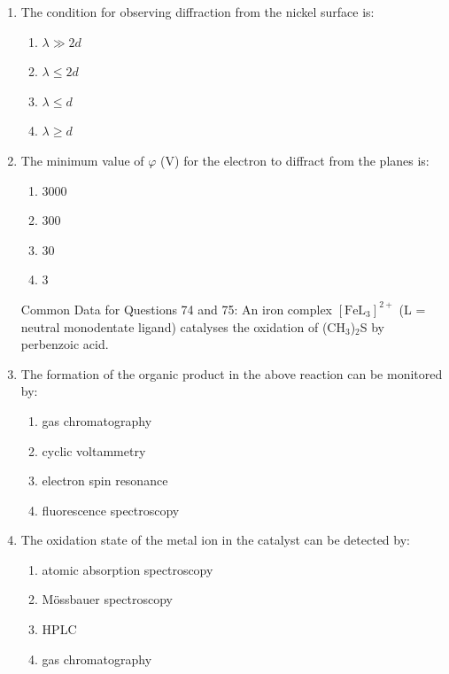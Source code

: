 \documentclass[12pt]{article}
\begin{document}
\begin{enumerate}
    \item The condition for observing diffraction from the nickel surface is:
    \begin{enumerate}
        \item $\lambda \gg 2d$
        \item $\lambda \leq 2d$
        \item $\lambda \leq d$
        \item $\lambda \geq d$
    \end{enumerate}    \hfill{}


    \item The minimum value of $\varphi$ (V) for the electron to diffract from the  planes is:
    \begin{enumerate}
        \item 3000
        \item 300
        \item 30
        \item 3
    \end{enumerate}
    \hfill{}


{Common Data for Questions 74 and 75:} 
An iron complex $[\text{FeL}_3]^{2+}$ (L = neutral monodentate ligand) catalyses the oxidation of (CH$_3$)$_2$S by perbenzoic acid.


    \item The formation of the organic product in the above reaction can be monitored by:
    \begin{enumerate}
        \item gas chromatography
        \item cyclic voltammetry
        \item electron spin resonance
        \item fluorescence spectroscopy
    \end{enumerate}    \hfill{}


    \item The oxidation state of the metal ion in the catalyst can be detected by:
    \begin{enumerate}
        \item atomic absorption spectroscopy
        \item M\"ossbauer spectroscopy
        \item HPLC
        \item gas chromatography
    \end{enumerate}
  \hfill{}



\end{enumerate}
\end{document}
